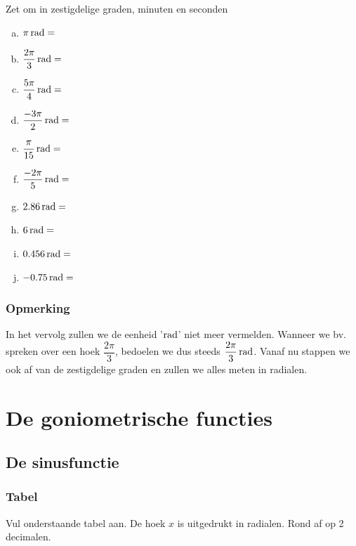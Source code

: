 \documentclass[a4paper,12pt]{article}
\begin{document}
\begin{oefening} Zet om in zestigdelige graden, minuten en seconden
\begin{multicols}{2}
\begin{enumerate}[(a)]
  \item $\pi \rad=$\arulefill
  \item $\dfrac{2\pi}{3} \rad=$\arulefill
  \item $\dfrac{5\pi}{4} \rad=$\arulefill
  \item $\dfrac{-3\pi}{2} \rad=$\arulefill
  \item $\dfrac{\pi}{15} \rad=$\arulefill
  \item $\dfrac{-2\pi}{5} \rad=$\arulefill
  \item $2.86 \rad=$\arulefill
  \item $6 \rad=$\arulefill
  \item $0.456 \rad=$\arulefill
  \item $-0.75 \rad=$\arulefill 
\end{enumerate}
\end{multicols}
\end{oefening}

\subsubsection{Opmerking}
In het vervolg zullen we de eenheid '$\rad$' niet meer vermelden. Wanneer we bv. spreken over een hoek  $\dfrac{2\pi}{3}$, bedoelen we dus steeds  $\dfrac{2\pi}{3} \rad$. Vanaf nu stappen we ook af van de zestigdelige graden en zullen we alles meten in radialen.

\newpage
\section{De goniometrische functies}
\subsection{De sinusfunctie}
\subsubsection{Tabel}
Vul onderstaande tabel aan. De hoek $x$ is uitgedrukt in radialen. Rond af op 2 decimalen.
\end{document}
